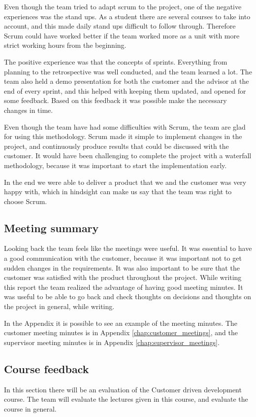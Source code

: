 Even though the team tried to adapt scrum to the project, one of the negative experiences was the stand ups. As a student there are several courses to take into account, and this made daily stand ups difficult to follow through. Therefore Scrum could have worked better if the team worked more as a unit with more strict working hours from the beginning.

The positive experience was that the concepts of sprints. Everything from planning to  the retrospective was well conducted, and the team learned a lot. The team also held a demo presentation for both the customer and the advisor at the end of every sprint, and this helped with keeping them updated, and opened for some feedback. Based on this feedback it was possible make the necessary changes in time.

Even though the team have had some difficulties with Scrum, the team are glad for using this methodology. Scrum made it simple to implement changes in the project, and continuously produce results that could be discussed with the customer. It would have been challenging to complete the project with a waterfall methodology, because it was important to start the implementation early.  

In the end we were able to deliver a product that we and the customer was very happy with, which in hindsight can make us say that the team was right to choose Scrum.

\subsection{Meeting summary}
Looking back the team feels like the meetings were useful. It was essential to have a good communication with the customer, because it was important not to get sudden changes in the requirements. It was also important to be sure that the customer was satisfied with the product throughout the project. While writing this report the team realized the advantage of having good meeting minutes. It was useful to be able to go back and check thoughts on decisions and thoughts on the project in general, while writing.

In the Appendix it is possible to see an example of the meeting minutes. The customer meeting minutes is in Appendix \ref{chap:customer_meetings}, and the supervisor meeting minutes is in Appendix \ref{chap:supervisor_meetings}. 
\subsection{Course feedback}
In this section there will be an evaluation of the Customer driven development course. The team will evaluate the lectures given in this course, and evaluate the course in general.

